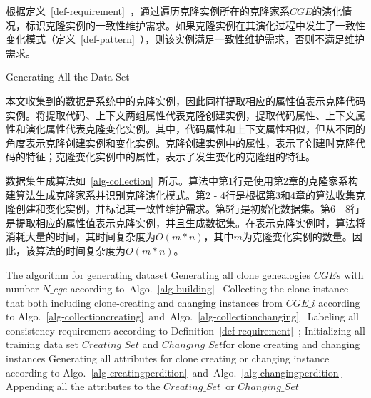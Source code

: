 根据定义~\ref{def-requirement}~，通过遍历克隆实例所在的克隆家系$CGE$的演化情况，标识克隆实例的一致性维护需求。如果克隆实例在其演化过程中发生了一致性变化模式（定义~\ref{def-pattern}~），则该实例满足一致性维护需求，否则不满足维护需求。

{Generating All the Data Set}

本文收集到的数据是系统中的克隆实例，因此同样提取相应的属性值表示克隆代码实例。将提取代码、上下文两组属性代表克隆创建实例，提取代码属性、上下文属性和演化属性代表克隆变化实例。其中，代码属性和上下文属性相似，但从不同的角度表示克隆创建实例和变化实例。克隆创建实例中的属性，表示了创建时克隆代码的特征；克隆变化实例中的属性，表示了发生变化的克隆组的特征。

数据集生成算法如~\ref{alg-collection}~所示。算法中第1行是使用第2章的克隆家系构建算法生成克隆家系并识别克隆演化模式。第2 - 4行是根据第3和4章的算法收集克隆创建和变化实例，并标记其一致性维护需求。第5行是初始化数据集。第6 - 8行是提取相应的属性值表示克隆实例，并且生成数据集。在表示克隆实例时，算法将消耗大量的时间，其时间复杂度为$O(m*n)$，其中$m$为克隆变化实例的数量。因此，该算法的时间复杂度为$O(m*n)$。

\vspace{1em}
\begin{minipage}{0.8\textwidth}
\centering
\begin{algorithm}[H]
 {The algorithm for generating dataset}
\label{alg-collection}
Generating all clone genealogies $CGEs$ with number $N\_cge$ according to~Algo.~\ref{alg-building}~\;
{ 
 Collecting the clone instance that both including clone-creating and changing instances from $CGE\_i$ according to Algo.~\ref{alg-collectioncreating}~and~Algo.~\ref{alg-collectionchanging}~\; 
 Labeling all consistency-requirement according to Definition~\ref{def-requirement}~;
}
Initializing all training data set $Creating\_Set$ and $Changing\_Set$for clone creating and changing instances\; 
{ 
Generating all attributes for clone creating or changing instance according to Algo.~\ref{alg-creatingperdition}~and~Algo.~\ref{alg-changingperdition}~\;
Appending all the attributes to the $Creating\_Set$\ or $Changing\_Set$\;
}
\end{algorithm}
\end{minipage}
\vspace{1em}

